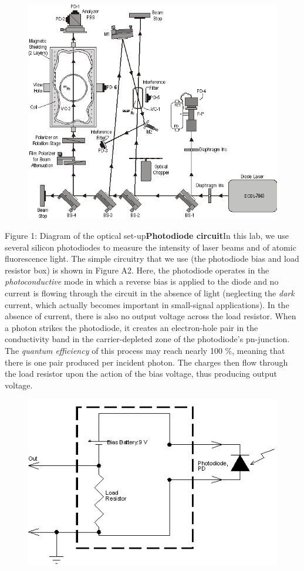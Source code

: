 \documentclass{../lab}
\begin{document}
\begin{figure}[h]
    \centering
    \href{http://experimentationlab.berkeley.edu/sites/default/files/images/MNOimage003.gif}{\includegraphics[width=0.5\linewidth]{images/MNOimage003.png}}
    \caption{}
    \label{fig:MNOimage003}
\end{figure}

Figure 1: Diagram of the optical set-up\textbf{Photodiode circuit}In this lab, we use several silicon photodiodes to measure the intensity of laser beams and of atomic fluorescence light. The simple circuitry that we use (the photodiode bias and load resistor box) is shown in Figure A2. Here, the photodiode operates in the \emph{photoconductive} mode in which a reverse bias is applied to the diode and no current is flowing through the circuit in the absence of light (neglecting the \emph{dark} current, which actually becomes important in small-signal applications). In the absence of current, there is also no output voltage across the load resistor. When a photon strikes the photodiode, it creates an electron-hole pair in the conductivity band in the carrier-depleted zone of the photodiode's pn-junction. The \emph{quantum efficiency} of this process may reach nearly 100 \%, meaning that there is one pair produced per incident photon. The charges then flow through the load resistor upon the action of the bias voltage, thus producing output voltage.

\begin{figure}[h]
    \centering
    \href{http://experimentationlab.berkeley.edu/sites/default/files/images/MNOimage023.gif}{\includegraphics[width=0.5\linewidth]{images/MNOimage023.png}}
    \caption{}
    \label{fig:MNOimage023}
\end{figure}
\end{document}
